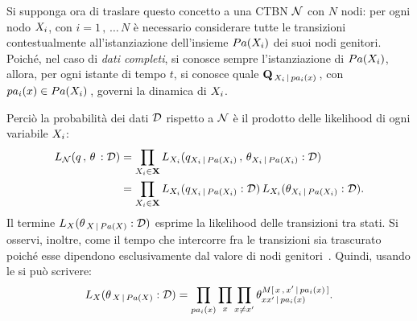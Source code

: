 Si supponga ora di traslare questo concetto a una \acl{CTBN} $\mathcal{N}$ con $N$ nodi: per ogni nodo $\mathnormal{X_i}$, con $i=1\,,\,\dotsc\,N$ è necessario considerare tutte le transizioni contestualmente all'istanziazione dell'insieme $Pa(\mathnormal{X_i})$ dei suoi nodi genitori. Poiché, nel caso di \emph{dati completi}, si conosce sempre l'istanziazione di $Pa(\mathnormal{X_i})$, allora, per ogni istante di tempo $t$, si conosce quale \im*{} $\mathbf{Q}_{\,\mathnormal{X_i}\,\arrowvert\,pa_i(\mathnormal{x})}\,$, con $pa_i(\mathnormal{x})\in Pa(\mathnormal{X_i})\,$, governi la dinamica di $\mathnormal{X_i}$.

Perciò la probabilità dei dati $\mathcal{D}$ rispetto a $\mathcal{N}$ è il prodotto delle likelihood di ogni variabile $\mathnormal{X_i}$:
\begin{equation}
\begin{split}
L_{\mathcal{N}}(q\,,\,\theta\,:\mathcal{D})&=\prod_{\mathnormal{X_i}\in\mathbf{X}}L_{\mathnormal{X_i}}(q_{\mathnormal{X_i}\,\arrowvert\,Pa(\mathnormal{X_i})}\,,\,\theta_{\mathnormal{X_i}\,\arrowvert\,Pa(\mathnormal{X_i})}:\mathcal{D}) \\
&=\prod_{\mathnormal{X_i}\in\mathbf{X}}L_{\mathnormal{X_i}}(q_{\mathnormal{X_i}\,\arrowvert\,Pa(\mathnormal{X_i})}:\mathcal{D})\,L_{\mathnormal{X_i}}(\theta_{\mathnormal{X_i}\,\arrowvert\,Pa(\mathnormal{X_i})}:\mathcal{D})\text{.}
\end{split}
\end{equation}
Il termine $L_{\mathnormal{X}}(\theta_{\,\mathnormal{X}\,\arrowvert\,Pa(\mathnormal{X})}:\mathcal{D})$ esprime la likelihood delle transizioni tra stati. Si osservi, inoltre, come il tempo che intercorre fra le transizioni sia trascurato poiché esse dipendono esclusivamente dal valore di nodi genitori~\citep[si veda][3]{Nodelman2002}. Quindi, usando le \emph{\stats{}} si può scrivere:
\[
L_{\setel{X}}(\theta_{\,\setel{X}\,\arrowvert\,Pa(\setel{X})}:\conceptsym{D})=\prod_{pa_i(\setel{x})} \prod_{x} \prod_{x\neq x^{\prime}}\theta_{xx^{\prime}\,\arrowvert\,pa_i(\setel{x})}^{\mstat[x]{x^{\prime}\,\arrowvert\,pa_i(\setel{x})}}\text{.}
\]

